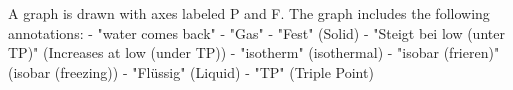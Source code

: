 A graph is drawn with axes labeled P and F. The graph includes the following annotations:
- "water comes back"
- "Gas"
- "Fest" (Solid)
- "Steigt bei low (unter TP)" (Increases at low (under TP))
- "isotherm" (isothermal)
- "isobar (frieren)" (isobar (freezing))
- "Flüssig" (Liquid)
- "TP" (Triple Point)